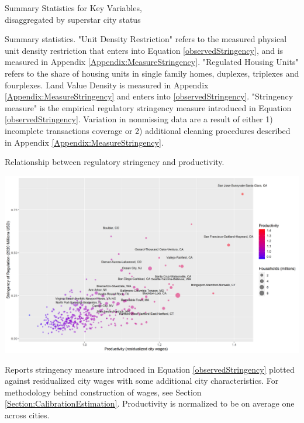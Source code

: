 \documentclass[12pt]{article}
\begin{document}
	
	\begin{landscape} 
		\begin{center}
	\begin{table}[h]
		
		\caption{Summary Statistics for Key Variables, \\
					 disaggregated by superstar city status}
		
		\makebox[\linewidth]{}\label{table:FactsStats}
		\caption*{Summary statistics. "Unit Density Restriction" refers to the measured physical unit density restriction that enters into Equation \eqref{observedStringency}, and is measured in Appendix \ref{Appendix:MeasureStringency}. "Regulated Housing Units" refers to the share of housing units in single family homes, duplexes, triplexes and fourplexes. Land Value Density is measured in Appendix \ref{Appendix:MeasureStringency} and enters into \eqref{observedStringency}. "Stringency measure" is the empirical regulatory stringency measure introduced in Equation \eqref{observedStringency}.  Variation in nonmissing data are a result of either 1) incomplete transactions coverage or 2) additional cleaning procedures described in Appendix \ref{Appendix:MeasureStringency}.}
	
	\end{table}		
	\end{center}	
	\end{landscape}
	
	\clearpage

	
	\begin{table}[htbp!]	
		\caption{Relationship between regulatory stringency and productivity.}\label{table:ProductivityStringency}
		\includegraphics[width=1.1\textwidth]{ProductivityStringency.png}
		\caption*{Reports stringency measure introduced in Equation \eqref{observedStringency} plotted against residualized city wages with some additional city characteristics. For methodology behind construction of wages, see Section \ref{Section:CalibrationEstimation}. Productivity is normalized to be on average one across cities.}
	\end{table}
	
\end{document}
